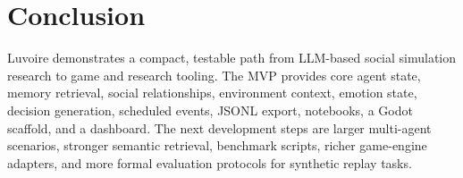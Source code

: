 \section{Conclusion}

Luvoire demonstrates a compact, testable path from LLM-based social simulation research to game and research tooling. The MVP provides core agent state, memory retrieval, social relationships, environment context, emotion state, decision generation, scheduled events, JSONL export, notebooks, a Godot scaffold, and a dashboard. The next development steps are larger multi-agent scenarios, stronger semantic retrieval, benchmark scripts, richer game-engine adapters, and more formal evaluation protocols for synthetic replay tasks.
